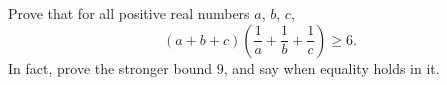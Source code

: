 Prove that for all positive real numbers $a$, $b$, $c$,
\[
(a+b+c)\left(\dfrac{1}{a}+\dfrac{1}{b}+\dfrac{1}{c}\right)\ge6 .
\]
In fact, prove the stronger bound $9$, and say when equality holds in it.
